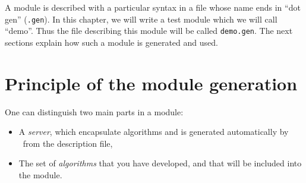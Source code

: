 %
%
%
%
%
%
%

A module is described with a particular syntax  in a file whose name ends
in ``dot   gen'' ({\tt .gen}).  In this   chapter, we will  write  a test
module which we will call ``demo''.  Thus the file describing this module
will be  called  {\tt demo.gen}.  The next  sections  explain  how such a
module is generated and used.

\section{Principle of the module generation}
\label{sec|session|principle}

One can distinguish two main parts in a module:

\begin{itemize}
   \item A {\em server}, which encapsulate algorithms and is generated
automatically by \GenoM\ from the description file,
   \item The set of {\em algorithms} that you have developed, and that
will be included into the module.
\end{itemize}

